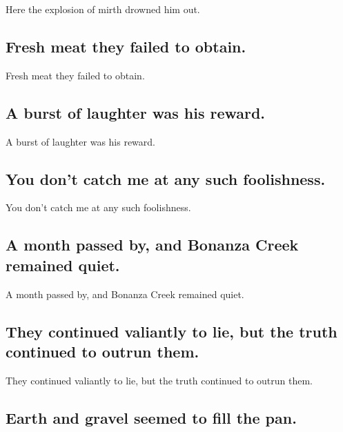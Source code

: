 \documentclass[]{article}
\begin{document}
Here the explosion of mirth drowned him out.

\hypertarget{fresh-meat-they-failed-to-obtain.}{%
\subsection{Fresh meat they failed to
obtain.}\label{fresh-meat-they-failed-to-obtain.}}

Fresh meat they failed to obtain.

\hypertarget{a-burst-of-laughter-was-his-reward.}{%
\subsection{A burst of laughter was his
reward.}\label{a-burst-of-laughter-was-his-reward.}}

A burst of laughter was his reward.

\hypertarget{you-dont-catch-me-at-any-such-foolishness.}{%
\subsection{You don't catch me at any such
foolishness.}\label{you-dont-catch-me-at-any-such-foolishness.}}

You don't catch me at any such foolishness.

\hypertarget{a-month-passed-by-and-bonanza-creek-remained-quiet.}{%
\subsection{A month passed by, and Bonanza Creek remained
quiet.}\label{a-month-passed-by-and-bonanza-creek-remained-quiet.}}

A month passed by, and Bonanza Creek remained quiet.

\hypertarget{they-continued-valiantly-to-lie-but-the-truth-continued-to-outrun-them.}{%
\subsection{They continued valiantly to lie, but the truth continued to
outrun
them.}\label{they-continued-valiantly-to-lie-but-the-truth-continued-to-outrun-them.}}

They continued valiantly to lie, but the truth continued to outrun them.

\hypertarget{earth-and-gravel-seemed-to-fill-the-pan.}{%
\subsection{Earth and gravel seemed to fill the
pan.}\label{earth-and-gravel-seemed-to-fill-the-pan.}}
\end{document}
